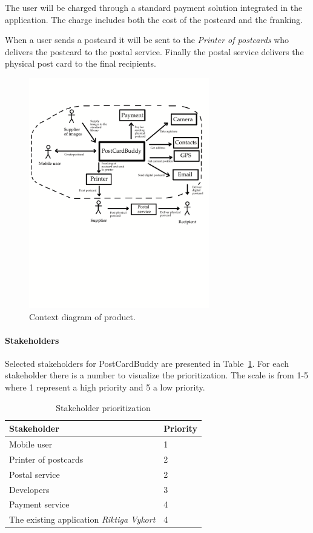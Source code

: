 \documentclass[10pt,a4paper]{article}
\begin{document}
The user will be charged through a standard payment solution integrated in the application. The charge includes both the cost of the postcard and the franking. 

When a user sends a postcard it will be sent to the  \textit{Printer of postcards} who delivers the postcard to the postal service. Finally the postal service delivers the physical post card to the final recipients. 

\begin{figure}[h!]
\centering
\includegraphics[width=0.7\textwidth]{ContextDiagram3.pdf}
\caption{Context diagram of product.}
\label{fig:context}
\end{figure}
\FloatBarrier

\paragraph{Stakeholders}
Selected stakeholders for PostCardBuddy are presented in Table~\ref{table:stakeholder}. For each stakeholder there is a number to visualize the prioritization. The scale is from 1-5 where 1 represent a high priority and 5 a low priority.


\begin{table}[h!]
\centering
\label{table:deliv}
\begin{tabular}{|l|l|} \hline
\textbf{Stakeholder} & \textbf{Priority} \\
\hline
Mobile user & 1\\
\hline
Printer of postcards & 2\\
\hline
Postal service & 2\\
\hline
Developers & 3\\
\hline
Payment service & 4\\
\hline
The existing application \textit{Riktiga Vykort} & 4\\
\hline

\end{tabular}\\
\caption{Stakeholder prioritization}
\label{table:stakeholder}
\end{table}
\end{document}
